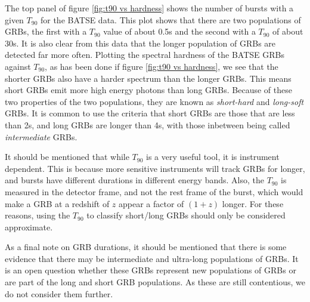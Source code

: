 \documentclass[11pt]{cuthesis}
\begin{document}
The top panel of figure \ref{fig:t90 vs hardness} shows the number of bursts with a given $T_{90}$ for the BATSE data. This plot shows that there are two populations of GRBs, the first with a $T_{90}$ value of about 0.5s and the second with a $T_{90}$ of about 30s. It is also clear from this data that the longer population of GRBs are detected far more often. Plotting the spectral hardness of the BATSE GRBs against $T_{90}$, as has been done if figure \ref{fig:t90 vs hardness}, we see that the shorter GRBs also have a harder spectrum than the longer GRBs. This means short GRBs emit more high energy photons than long GRBs. Because of these two properties of the two populations, they are known as \textit{short-hard} and \textit{long-soft} GRBs. It is common to use the criteria that short GRBs are those that are less than 2s, and long GRBs are longer than 4s, with those inbetween being called \textit{intermediate} GRBs.


It should be mentioned that while $T_{90}$ is a very useful tool, it is instrument dependent. This is because more sensitive instruments will track GRBs for longer, and bursts have different durations in different energy bands. Also, the $T_{90}$ is measured in the detector frame, and not the rest frame of the burst, which would make a GRB at a redshift of $z$ appear a factor of $(1+z)$ longer. For these reasons, using the $T_{90}$ to classify short/long GRBs should only be considered approximate.  

As a final note on GRB durations, it should be mentioned that there is some evidence that there may be intermediate and ultra-long populations of GRBs. It is an open question whether these GRBs represent new populations of GRBs or are part of the long and short GRB populations. As these are still contentious, we do not consider them further. 
\end{document}
